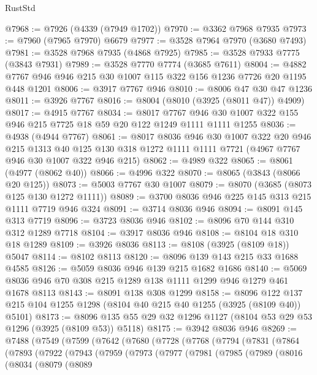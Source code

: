\begin{lexlean}{RustStd}
\begin{coremodule}
@7968 := @7926 (@4339 (@7949 @1702))
@7970 := @3362 @7968 @7935
@7973 := @7960 (@7965 @7970) @6679
@7977 := @3528 @7964 @7970 (@3680 @7493)
@7981 := @3528 @7968 @7935 (@4868 @7925)
@7985 := @3528 @7933 @7775 (@3843 @7931)
@7989 := @3528 @7770 @7774 (@3685 @7611)
@8004 := @4882 @7767 @946 @946 @215 @30 @1007 @115 @322 @156 @1236 @7726 @20 @1195 @448 @1201
@8006 := @3917 @7767 @946
@8010 := @8006 @47 @30 @47 @1236
@8011 := @3926 @7767
@8016 := @8004 (@8010 (@3925 (@8011 @47)) @4909)
@8017 := @4915 @7767
@8034 := @8017
    @7767
    @946
    @30
    @1007
    @322
    @155
    @946
    @215
    @7725
    @18
    @59
    @20
    @122
    @1249
    @1111
    @1111
    @1255
@8036 := @4938 (@4944 @7767)
@8061 := @8017
    @8036
    @946
    @30
    @1007
    @322
    @20
    @946
    @215
    @1313
    @40
    @125
    @130
    @318
    @1272
    @1111
    @1111
    @7721
    (@4967 @7767 @946 @30 @1007 @322 @946 @215)
@8062 := @4989 @322
@8065 := @8061 (@4977 (@8062 @40))
@8066 := @4996 @322
@8070 := @8065 (@3843 (@8066 @20 @125))
@8073 := @5003 @7767 @30 @1007
@8079 := @8070 (@3685 (@8073 @125 @130 @1272 @1111))
@8089 := @3700 @8036 @946 @225 @145 @313 @215 @1111 @7719 @946 @324
@8091 := @3714 @8036 @946
@8094 := @8091 @145 @313 @7719
@8096 := @3723 @8036 @946
@8102 := @8096 @70 @144 @310 @312 @1289 @7718
@8104 := @3917 @8036 @946
@8108 := @8104 @18 @310 @18 @1289
@8109 := @3926 @8036
@8113 := @8108 (@3925 (@8109 @18)) @5047
@8114 := @8102 @8113
@8120 := @8096 @139 @143 @215 @33 @1688 @4585
@8126 := @5059 @8036 @946 @139 @215 @1682 @1686
@8140 := @5069 @8036 @946 @70 @308 @215 @1289 @138 @1111 @1299 @946 @1279 @461 @1678 @8113
@8143 := @8091 @138 @308 @1299
@8158 := @8096 @122 @137 @215 @104 @1255 @1298 (@8104 @40 @215 @40 @1255 (@3925 (@8109 @40)) @5101)
@8173 := @8096 @135 @55 @29 @32 @1296 @1127 (@8104 @53 @29 @53 @1296 (@3925 (@8109 @53)) @5118)
@8175 := @3942 @8036 @946
@8269 := @7488
    (@7549
      (@7599
        (@7642
          (@7680
            (@7728
              (@7768
                (@7794
                  (@7831
                    (@7864
                      (@7893
                        (@7922
                          (@7943
                            (@7959
                              (@7973
                                (@7977
                                  (@7981
                                    (@7985
                                      (@7989
                                        (@8016
                                          (@8034
                                            (@8079
                                              (@8089

\end{coremodule}
\end{lexlean}
